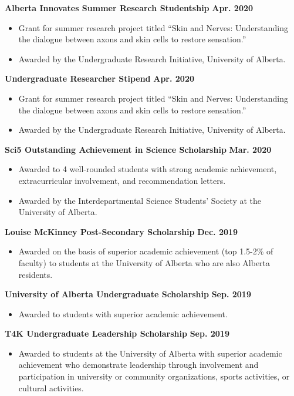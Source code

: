 \documentclass{article}
\begin{document}
    \textbf{Alberta Innovates Summer Research Studentship} \hfill \textbf{Apr. 2020}
    \begin{itemize}
        \item Grant for summer research project titled ``Skin and Nerves: Understanding the dialogue between axons and skin cells to restore sensation.''
        \item Awarded by the Undergraduate Research Initiative, University of Alberta.
    \end{itemize}
    \textbf{Undergraduate Researcher Stipend} \hfill \textbf{Apr. 2020}
    \begin{itemize}
        \item Grant for summer research project titled ``Skin and Nerves: Understanding the dialogue between axons and skin cells to restore sensation.''
        \item Awarded by the Undergraduate Research Initiative, University of Alberta.
    \end{itemize}
    \textbf{Sci5 Outstanding Achievement in Science Scholarship} \hfill \textbf{Mar. 2020}
    \begin{itemize}
        \item Awarded to 4 well-rounded students with strong academic achievement, extracurricular involvement, and recommendation letters.
        \item Awarded by the Interdepartmental Science Students' Society at the University of Alberta.
    \end{itemize}
    \textbf{Louise McKinney Post-Secondary Scholarship} \hfill \textbf{Dec. 2019}
        \begin{itemize}
            \item Awarded on the basis of superior academic achievement (top 1.5-2\% of faculty) to students at the University of Alberta who are also Alberta residents.
        \end{itemize}
    \textbf{University of Alberta Undergraduate Scholarship} \hfill \textbf{Sep. 2019}
        \begin{itemize}
            \item Awarded to students with superior academic achievement.
        \end{itemize}
    \textbf{T4K Undergraduate Leadership Scholarship} \hfill \textbf{Sep. 2019}
        \begin{itemize}
            \item Awarded to students at the University of Alberta with superior academic achievement who demonstrate leadership through involvement and participation in university or community organizations, sports activities, or cultural activities.
        \end{itemize}
\end{document}
